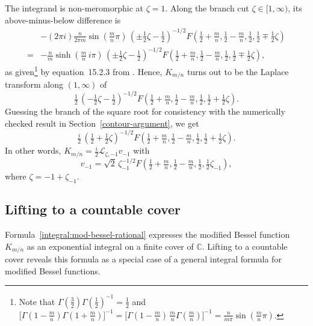 \documentclass{article}
\theoremstyle{plain}
\newcommand{\C}{\mathbb{C}}
\newcommand{\laplace}{\mathcal{L}}
\begin{document}
The integrand is non-meromorphic at $\zeta = 1$. Along the branch cut $\zeta \in [1, \infty)$, its above-minus-below difference is
\begin{align*}
& -(2\pi i)\tfrac{n}{2\pi m} \sin(\tfrac{m}{n} \pi)\,(\pm\tfrac{1}{2}\zeta - \tfrac{1}{2})^{-1/2} F(\tfrac{1}{2} + \tfrac{m}{n}, \tfrac{1}{2} - \tfrac{m}{n}, \tfrac{1}{2}, \tfrac{1}{2} \mp \tfrac{1}{2}\zeta) \\
= & -\tfrac{n}{m} \sinh(\tfrac{m}{n}\,i\pi)\,(\pm\tfrac{1}{2}\zeta - \tfrac{1}{2})^{-1/2} F(\tfrac{1}{2} + \tfrac{m}{n}, \tfrac{1}{2} - \tfrac{m}{n}, \tfrac{1}{2}, \tfrac{1}{2} \mp \tfrac{1}{2}\zeta),
\end{align*}
as given\footnote{Note that $\Gamma(\tfrac{3}{2}) \Gamma(\tfrac{1}{2})^{-1} = \tfrac{1}{2}$ and $\big[\Gamma(1 - \tfrac{m}{n})\Gamma(1 + \tfrac{m}{n})\big]^{-1} = \big[\Gamma(1 - \tfrac{m}{n})\,\tfrac{m}{n}\Gamma(\tfrac{m}{n})\big]^{-1} = \tfrac{n}{m\pi} \sin(\tfrac{m}{n} \pi)$.} by equation~15.2.3 from \cite{dlmf}. Hence, $K_{m/n}$ turns out to be the Laplace transform along $(1, \infty)$ of
\[ \tfrac{1}{2}\,(-\tfrac{1}{2}\zeta - \tfrac{1}{2})^{-1/2} F(\tfrac{1}{2} + \tfrac{m}{n}, \tfrac{1}{2} - \tfrac{m}{n}, \tfrac{1}{2}, \tfrac{1}{2} + \tfrac{1}{2}\zeta). \]
\color{DarkCyan}
Guessing the branch of the square root for consistency with the numerically checked result in Section~\ref{contour-argument}, we get
\[ \tfrac{i}{2}\,(\tfrac{1}{2} + \tfrac{1}{2}\zeta)^{-1/2} F(\tfrac{1}{2} + \tfrac{m}{n}, \tfrac{1}{2} - \tfrac{m}{n}, \tfrac{1}{2}, \tfrac{1}{2} + \tfrac{1}{2}\zeta). \]
In other words, $K_{m/n} = \tfrac{i}{2} \laplace_{\zeta, -1} v_{-1}$ with
\[ v_{-1} = \sqrt{2}\,\zeta_{-1}^{-1/2} F(\tfrac{1}{2} + \tfrac{m}{n}, \tfrac{1}{2} - \tfrac{m}{n}, \tfrac{1}{2}, \tfrac{1}{2}\zeta_{-1}), \]
where $\zeta = -1 + \zeta_{-1}$.
\color{black}
\subsection{Lifting to a countable cover}
Formula~\ref{integral:mod-bessel-rational} expresses the modified Bessel function $K_{m/n}$ as an exponential integral on a finite cover of $\C$. Lifting to a countable cover reveals this formula as a special case of a general integral formula for modified Bessel functions.
\end{document}
